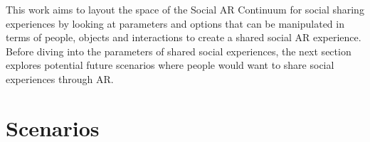 

This work aims to layout the space of the Social AR Continuum for social sharing experiences by looking at parameters and options that can be manipulated in terms of people, objects and interactions to create a shared social AR experience. Before diving into the parameters of shared social experiences, the next section explores potential future scenarios where people would want to share social experiences through AR.

\section{Scenarios}


